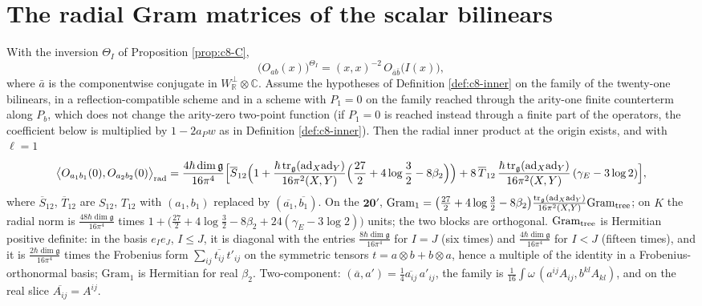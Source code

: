 \section{The radial Gram matrices of the scalar bilinears}

\begin{proposition}
\label{prop:c20-gram}
With the inversion $\Theta_I$ of Proposition \ref{prop:c8-C},
\[
\big(O_{ab}(x)\big)^{\Theta_I}=(x,x)^{-2}\,O_{\bar a\bar b}\big(I(x)\big),
\]
where $\bar a$ is the componentwise conjugate in $W_{\mathbb R}^\perp\otimes\mathbb C$. Assume the hypotheses of Definition \ref{def:c8-inner} on the family of the twenty-one bilinears, in a reflection-compatible scheme and in a scheme with $P_1=0$ on the family reached through the arity-one finite counterterm along $P_b$, which does not change the arity-zero two-point function (if $P_1=0$ is reached instead through a finite part of the operators, the coefficient below is multiplied by $1-2a_Pw$ as in Definition \ref{def:c8-inner}). Then the radial inner product at the origin exists, and with $\ell=1$
\begin{equation}
\big\langle O_{a_1b_1}(0),O_{a_2b_2}(0)\big\rangle_{\rm rad}=\frac{4\hbar\dim\mathfrak g}{16\pi^4}\Big[\overline S_{12}\Big(1+\frac{\hbar\operatorname{tr}_{\mathfrak g}(\mathrm{ad}_X\mathrm{ad}_Y)}{16\pi^2(X,Y)}\Big(\frac{27}2+4\log\frac32-8\beta_2\Big)\Big)+8\,\overline T_{12}\,\frac{\hbar\operatorname{tr}_{\mathfrak g}(\mathrm{ad}_X\mathrm{ad}_Y)}{16\pi^2(X,Y)}\,(\gamma_E-3\log2)\Big],
\label{eq:c20-gram}
\end{equation}
where $\overline S_{12}$, $\overline T_{12}$ are $S_{12}$, $T_{12}$ with $(a_1,b_1)$ replaced by $(\overline{a_1},\overline{b_1})$. On the $\mathbf{20'}$, $\mathrm{Gram}_1=\big(\tfrac{27}2+4\log\tfrac32-8\beta_2\big)\frac{\operatorname{tr}_{\mathfrak g}(\mathrm{ad}_X\mathrm{ad}_Y)}{16\pi^2(X,Y)}\mathrm{Gram}_{\rm tree}$; on $K$ the radial norm is $\frac{48\hbar\dim\mathfrak g}{16\pi^4}$ times $1+\big(\tfrac{27}2+4\log\tfrac32-8\beta_2+24(\gamma_E-3\log2)\big)$ units; the two blocks are orthogonal. $\mathrm{Gram}_{\rm tree}$ is Hermitian positive definite: in the basis $e_Ie_J$, $I\le J$, it is diagonal with the entries $\frac{8\hbar\dim\mathfrak g}{16\pi^4}$ for $I=J$ (six times) and $\frac{4\hbar\dim\mathfrak g}{16\pi^4}$ for $I<J$ (fifteen times), and it is $\frac{2\hbar\dim\mathfrak g}{16\pi^4}$ times the Frobenius form $\sum_{ij}\overline{t_{ij}}\,t'_{ij}$ on the symmetric tensors $t=a\otimes b+b\otimes a$, hence a multiple of the identity in a Frobenius-orthonormal basis; $\mathrm{Gram}_1$ is Hermitian for real $\beta_2$. Two-component: $(\overline a,a')=\tfrac14\overline{a_{ij}}\,a'_{ij}$, the family is $\tfrac1{16}\int\omega\,(a^{ij}A_{ij},b^{kl}A_{kl})$, and on the real slice $\overline{A_{ij}}=A^{ij}$.
\end{proposition}

